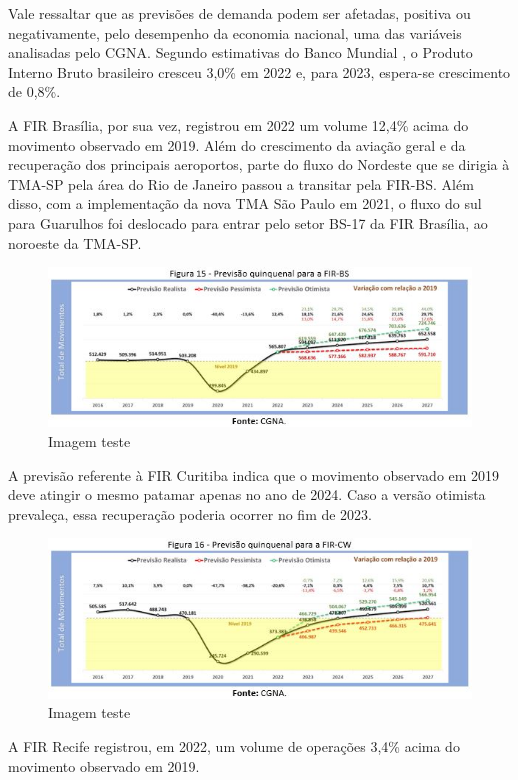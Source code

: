 \documentclass[
]{book}
\begin{document}
Vale ressaltar que as previsões de demanda podem ser afetadas, positiva ou negativamente, pelo desempenho da economia nacional, uma das variáveis analisadas pelo CGNA. Segundo estimativas do Banco Mundial , o Produto Interno Bruto brasileiro cresceu 3,0\% em 2022 e, para 2023, espera-se crescimento de 0,8\%.

A FIR Brasília, por sua vez, registrou em 2022 um volume 12,4\% acima do movimento observado em 2019. Além do crescimento da aviação geral e da recuperação dos principais aeroportos, parte do fluxo do Nordeste que se dirigia à TMA-SP pela área do Rio de Janeiro passou a transitar pela FIR-BS. Além disso, com a implementação da nova TMA São Paulo em 2021, o fluxo do sul para Guarulhos foi deslocado para entrar pelo setor BS-17 da FIR Brasília, ao noroeste da TMA-SP.

\begin{figure}
\centering
\includegraphics{imagens/fig18.jpg}
\caption{Imagem teste}
\end{figure}

A previsão referente à FIR Curitiba indica que o movimento observado em 2019 deve atingir o mesmo patamar apenas no ano de 2024. Caso a versão otimista prevaleça, essa recuperação poderia ocorrer no fim de 2023.

\begin{figure}
\centering
\includegraphics{imagens/fig19.jpg}
\caption{Imagem teste}
\end{figure}

A FIR Recife registrou, em 2022, um volume de operações 3,4\% acima do movimento observado em 2019.
\end{document}
